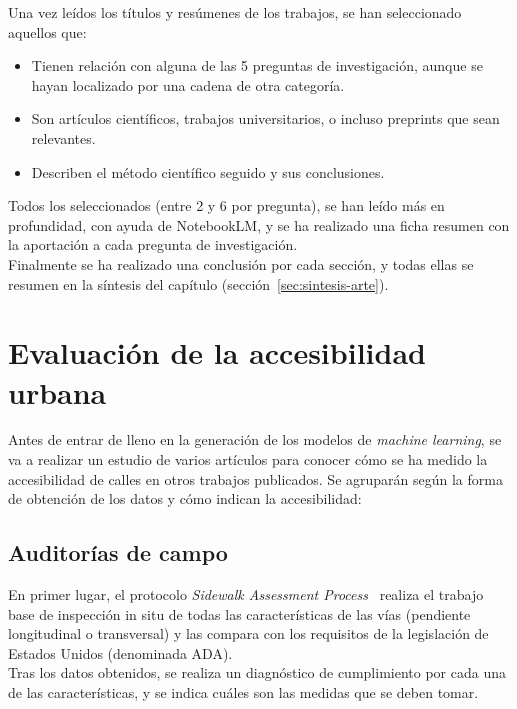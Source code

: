 Una vez leídos los títulos y resúmenes de los trabajos, se han seleccionado aquellos que:
\begin{itemize}
  \item Tienen relación con alguna de las 5 preguntas de investigación, aunque se hayan localizado por una cadena de otra categoría.
  \item Son artículos científicos, trabajos universitarios, o incluso preprints que sean relevantes.
  \item Describen el método científico seguido y sus conclusiones.
\end{itemize}

Todos los seleccionados (entre 2 y 6 por pregunta), se han leído más en profundidad, con ayuda de NotebookLM, y se ha realizado una ficha resumen con la aportación a cada pregunta de investigación.
\\

Finalmente se ha realizado una conclusión por cada sección, y todas ellas se resumen en la síntesis del capítulo (sección~\ref{sec:sintesis-arte}).
\\

\section{Evaluación de la accesibilidad urbana}
\label{sec:eval-accesibilidad}

Antes de entrar de lleno en la generación de los modelos de \textit{machine learning}, se va a realizar un estudio de varios artículos para conocer cómo se ha medido la accesibilidad de calles en otros trabajos publicados. Se agruparán según la forma de obtención de los datos y cómo indican la accesibilidad:

\subsection{Auditorías de campo}
\label{subsec:eval-campo}
En primer lugar, el protocolo \textit{Sidewalk Assessment Process}~\parencite{axelson1999} realiza el trabajo base de inspección in situ de todas las características de las vías (pendiente longitudinal o transversal) y las compara con los requisitos de la legislación de Estados Unidos (denominada \gls{ADA}).
\\

Tras los datos obtenidos, se realiza un diagnóstico de cumplimiento por cada una de las características, y se indica cuáles son las medidas que se deben tomar.
\\

